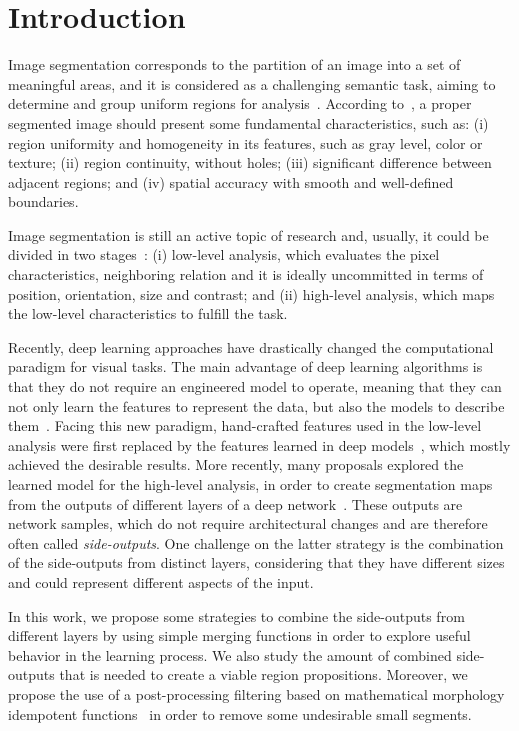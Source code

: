 \section{Introduction}
\label{sec:intro}

Image segmentation corresponds to the partition of an image into a set of meaningful areas, and it is considered as a challenging semantic task, aiming to determine and group uniform regions for analysis~\cite{DOMINGUEZ}. According to~\cite{DOMINGUEZ}, a proper segmented image should present some fundamental characteristics, such as: (i) region uniformity and homogeneity in  its features, such as gray level, color or texture; (ii) region continuity, without holes; (iii) significant difference between adjacent regions; and (iv) spatial accuracy with smooth and well-defined boundaries. 

Image segmentation is still an active topic of research and, usually, it could be divided in two stages~\cite{guigues06}: (i) low-level analysis, which evaluates the pixel characteristics, neighboring relation and it is ideally uncommitted in terms of position, orientation, size and contrast; and (ii) high-level analysis, which maps the low-level characteristics to fulfill the task.  

Recently, deep learning approaches have drastically changed the computational paradigm for visual tasks. The main advantage of deep learning algorithms is that they do not require an engineered model to operate, meaning that they can not only learn the features to represent the data, but also the models to describe them~\cite{goodfellow16}. Facing this new paradigm, hand-crafted features used in the low-level analysis were first replaced by the features learned in deep models~\cite{farabet2013,simonyan2014,lee2015}, which mostly achieved the desirable results. More recently, many proposals explored the learned model for the high-level analysis, in order to create segmentation maps from the outputs of different layers of a deep network~\cite{xie2017,cheng2016,maninis2017,liu2017, Yang2018}. 
These outputs are network samples, which do not require architectural changes and are therefore often called \textit{side-outputs}. 
One challenge on the latter strategy is the combination of the side-outputs from distinct layers, considering that they have different sizes and could represent different aspects of the input.  

In this work, we propose some strategies to combine the side-outputs from different layers by using simple merging functions in order to explore useful behavior in the learning process. We also study the amount of combined side-outputs that is needed to create a viable region propositions. Moreover, we propose the use of a post-processing filtering based on mathematical morphology idempotent functions~\cite{najman13} in order to remove some undesirable small segments.

